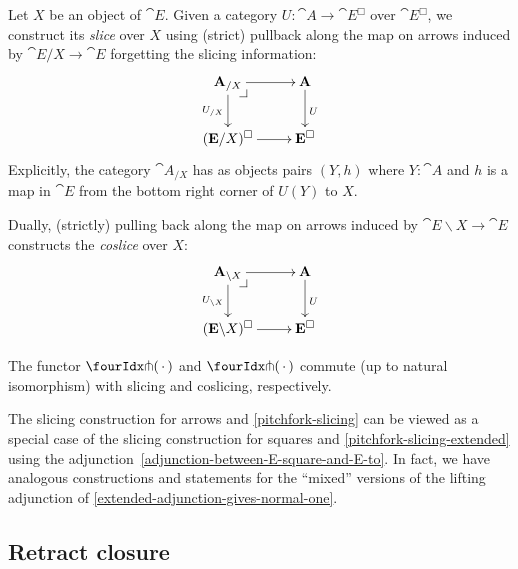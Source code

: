 \documentclass[reqno,10pt,a4paper,oneside]{amsart}
\begin{document}
Let $X$ be an object of $\cat{E}$.
Given a category $U : \cat{A} \to \cat{E}^{\Box}$ over $\cat{E}^{\Box}$, we construct its \emph{slice} over $X$ using (strict) pullback along the map on arrows induced by $\cat{E}/X \to \cat{E}$ forgetting the slicing information:
\[
\xymatrix{
  \cat{A}_{/X}
  \ar[r]
  \ar[d]_{U_{/X}}
  \pullback{dr}
&
  \cat{A}
  \ar[d]^{U}
\\
  (\cat{E}/X)^{\Box}
  \ar[r]
&
  \cat{E}^{\Box}
}
\]
Explicitly, the category $\cat{A}_{/X}$ has as objects pairs $(Y, h)$ where $Y : \cat{A}$ and $h$ is a map in $\cat{E}$ from the bottom right corner of $U(Y)$ to $X$.

Dually, (strictly) pulling back along the map on arrows induced by $\cat{E} \backslash X \to \cat{E}$ constructs the \emph{coslice} over $X$:
\[
\xymatrix{
  \cat{A}_{\backslash X}
  \ar[r]
  \ar[d]_{U_{\backslash X}}
  \pullback{dr}
&
  \cat{A}
  \ar[d]^{U}
\\
  (\cat{E} \backslash X)^{\Box}
  \ar[r]
&
  \cat{E}^{\Box}
}
\]

\begin{lemma}
\label{pitchfork-slicing-extended}
The functor $\liftr{\brarghole}$ and $\liftl{\brarghole}$ commute (up to natural isomorphism) with slicing and coslicing, respectively.
\end{lemma}

\begin{remark}
\label{slicing-mixed}
The slicing construction for arrows and \cref{pitchfork-slicing} can be viewed as a special case of the slicing construction for squares and \cref{pitchfork-slicing-extended} using the adjunction~\eqref{adjunction-between-E-square-and-E-to}.
In fact, we have analogous constructions and statements for the ``mixed'' versions of the lifting adjunction of \cref{extended-adjunction-gives-normal-one}.
\end{remark}

\subsection{Retract closure}
\end{document}
